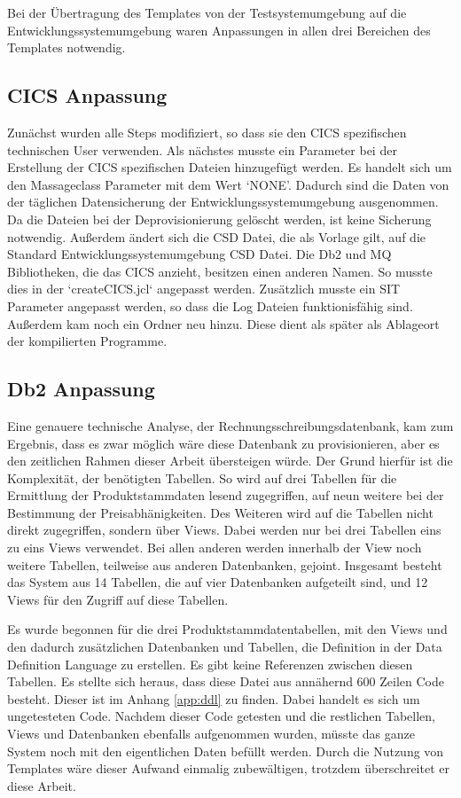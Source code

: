 Bei der Übertragung des Templates von der Testsystemumgebung auf die Entwicklungssystemumgebung waren Anpassungen in allen drei Bereichen des Templates notwendig.

\subsection{CICS Anpassung}
Zunächst wurden alle Steps modifiziert, so dass sie den CICS spezifischen technischen User verwenden.
Als nächstes musste ein Parameter bei der Erstellung der CICS spezifischen Dateien hinzugefügt werden.
Es handelt sich um den Massageclass Parameter mit dem Wert `NONE'.
Dadurch sind die Daten von der täglichen Datensicherung der Entwicklungssystemumgebung ausgenommen.
Da die Dateien bei der Deprovisionierung gelöscht werden, ist keine Sicherung notwendig.
Außerdem ändert sich die CSD Datei, die als Vorlage gilt, auf die Standard Entwicklungssystemumgebung CSD Datei.
Die Db2 und MQ Bibliotheken, die das CICS anzieht, besitzen einen anderen Namen.
So musste dies in der `createCICS.jcl` angepasst werden.
Zusätzlich musste ein SIT Parameter angepasst werden, so dass die Log Dateien funktionisfähig sind.
Außerdem kam noch ein Ordner neu hinzu.
Diese dient als später als Ablageort der kompilierten Programme.

\subsection{Db2 Anpassung}\label{ssec:db2entw}
Eine genauere technische Analyse, der Rechnungsschreibungsdatenbank, kam zum Ergebnis, dass es zwar möglich wäre diese Datenbank zu provisionieren, aber es den zeitlichen Rahmen dieser Arbeit übersteigen würde.
Der Grund hierfür ist die Komplexität, der benötigten Tabellen.
So wird auf drei Tabellen für die Ermittlung der Produktstammdaten lesend zugegriffen, auf neun weitere bei der Bestimmung der Preisabhänigkeiten.
Des Weiteren wird auf die Tabellen nicht direkt zugegriffen, sondern über Views.
Dabei werden nur bei drei Tabellen eins zu eins Views verwendet.
Bei allen anderen werden innerhalb der View noch weitere Tabellen, teilweise aus anderen Datenbanken, gejoint.
Insgesamt besteht das System aus 14 Tabellen, die auf vier Datenbanken aufgeteilt sind, und 12 Views für den Zugriff auf diese Tabellen.

Es wurde begonnen für die drei Produktstammdatentabellen, mit den Views und den dadurch zusätzlichen Datenbanken und Tabellen, die Definition in der Data Definition Language zu erstellen.
Es gibt keine Referenzen zwischen diesen Tabellen.
Es stellte sich heraus, dass diese Datei aus annähernd 600 Zeilen Code besteht.
Dieser ist im Anhang \ref{app:ddl} zu finden.
Dabei handelt es sich um ungetesteten Code.
Nachdem dieser Code getesten und die restlichen Tabellen, Views und Datenbanken ebenfalls aufgenommen wurden, müsste das ganze System noch mit den eigentlichen Daten befüllt werden.
Durch die Nutzung von Templates wäre dieser Aufwand einmalig zubewältigen, trotzdem überschreitet er diese Arbeit.

